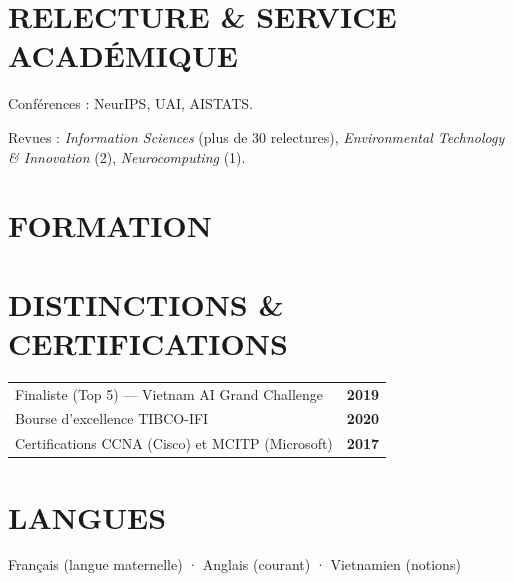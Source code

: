 \section{RELECTURE \& SERVICE ACADÉMIQUE}
\begin{cvitems}
  \item Conférences : NeurIPS, UAI, AISTATS.
  \item Revues : \textit{Information Sciences} (plus de 30 relectures), \textit{Environmental Technology \& Innovation} (2), \textit{Neurocomputing} (1).
\end{cvitems}

\section{FORMATION}

\noindent\begin{minipage}[t]{0.55\linewidth}
\section{DISTINCTIONS \& CERTIFICATIONS}
{\small\begin{tabularx}{\linewidth}{@{}X r@{}}
  Finaliste (Top 5) — Vietnam AI Grand Challenge & {\color{accent}\bfseries 2019}\\
  Bourse d’excellence TIBCO-IFI & {\color{accent}\bfseries 2020}\\
  Certifications CCNA (Cisco) et MCITP (Microsoft) & {\color{accent}\bfseries 2017}\\
\end{tabularx}}
\end{minipage}\hfill
\begin{minipage}[t]{0.40\linewidth}
\section{LANGUES}
{\small Français (langue maternelle) · Anglais (courant) · Vietnamien (notions)}
\end{minipage}

